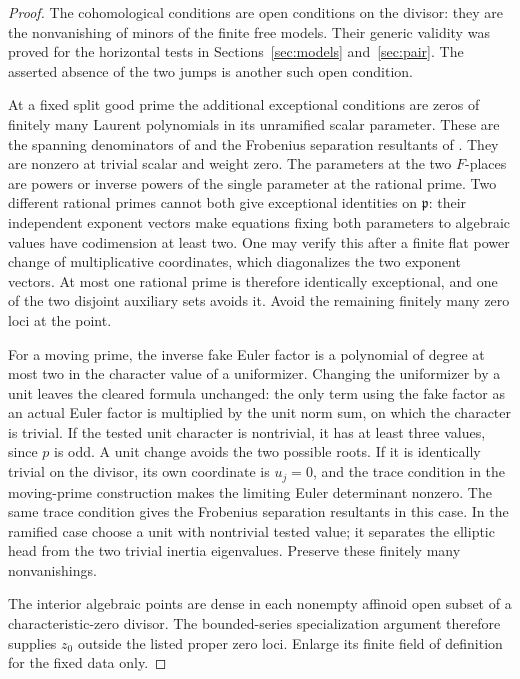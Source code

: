 \begin{proof}
The cohomological conditions are open conditions on the divisor:
they are the nonvanishing of minors of the finite free models.
Their generic validity was proved for the horizontal tests in
Sections~\ref{sec:models} and~\ref{sec:pair}.  The asserted absence of
the two jumps is another such open condition.

At a fixed split good prime the additional exceptional conditions
are zeros of finitely many Laurent polynomials in its unramified
scalar parameter.  These are the spanning denominators of
\cite[Lemma 6.4]{C} and the
Frobenius separation resultants of
\cite[Equation (8.11) and Lemma 8.6]{C}.
They are nonzero at trivial scalar and weight zero.  The parameters
at the two $F$-places are powers or inverse powers of the single
parameter at the rational prime.  Two different rational primes
cannot both give exceptional identities on $\mathfrak p$: their
independent exponent vectors make equations fixing both parameters
to algebraic values have codimension at least two.  One may verify
this after a finite flat power change of multiplicative coordinates,
which diagonalizes the two exponent vectors.  At most one rational
prime is therefore identically exceptional, and one of the two
disjoint auxiliary sets avoids it.  Avoid the remaining finitely
many zero loci at the point.

For a moving prime, the inverse fake Euler factor is a polynomial of
degree at most two in the character value of a uniformizer.  Changing
the uniformizer by a unit leaves the cleared formula unchanged:
the only term using the fake factor as an actual Euler factor is
multiplied by the unit norm sum, on which the character is trivial.
If the tested unit character is nontrivial, it has at least three
values, since $p$ is odd.  A unit change avoids the two possible
roots.  If it is identically trivial on the divisor, its own
coordinate is $u_j=0$, and the trace condition in the moving-prime
construction makes the limiting Euler determinant nonzero.
The same trace condition gives the Frobenius separation resultants
in this case.  In the ramified case choose a unit with nontrivial
tested value; it separates the elliptic head from the two trivial
inertia eigenvalues.  Preserve these finitely many nonvanishings.

The interior algebraic points are dense in each nonempty affinoid
open subset of a characteristic-zero divisor.  The bounded-series
specialization argument therefore supplies $z_0$ outside the listed
proper zero loci.  Enlarge its finite field of definition for the
fixed data only.
\end{proof}

